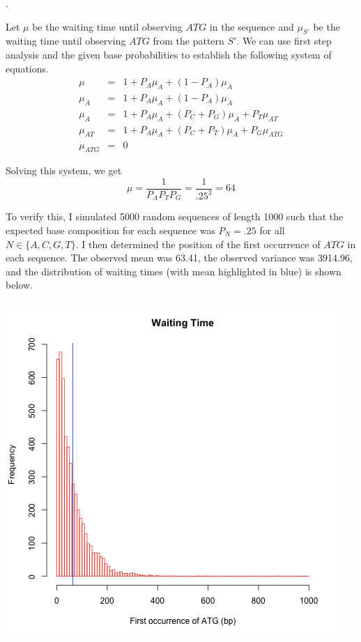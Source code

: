 \documentclass[a4paper, 10pt]{article}
\newcounter{prob_num}
\newcommand{\problem}{\vspace{20pt}\arabic{prob_num}.\stepcounter{prob_num}\par}
\begin{document}
\problem

Let $\mu$ be the waiting time until observing $ATG$ in the sequence and $\mu_{S'}$ be the waiting time until observing $ATG$ from the pattern $S'$. We can use first step analysis and the given base probabilities to establish the following system of equations.
\begin{eqnarray}
  \mu           &=& 1 + P_A \mu_A + (1 - P_A)\mu_{\bar{A}} \nonumber \\
  \mu_{\bar{A}} &=& 1 + P_A \mu_A + (1 - P_A)\mu_{\bar{A}} \nonumber \\
  \mu_A         &=& 1 + P_A \mu_A + (P_C + P_G)\mu_{\bar{A}} + P_T\mu_{AT} \nonumber \\
  \mu_{AT}      &=& 1 + P_A \mu_A + (P_C + P_T)\mu_{\bar{A}} + P_G\mu_{ATG} \nonumber \\
  \mu_{ATG}     &=& 0 \nonumber
\end{eqnarray}

Solving this system, we get \[ \mu = \frac{1}{P_A P_T P_G} = \frac{1}{.25^3} = 64 \]

To verify this, I simulated 5000 random sequences of length 1000 such that the expected base composition for each sequence was $P_N = .25$ for all $N \in \{A, C, G, T\}$. I then determined the position of the first occurrence of $ATG$ in each sequence. The observed mean was 63.41, the observed variance was 3914.96, and the distribution of waiting times (with mean highlighted in blue) is shown below.

\begin{center}
  \includegraphics[scale=.75]{waiting-time-atg.png}
\end{center}
\end{document}
